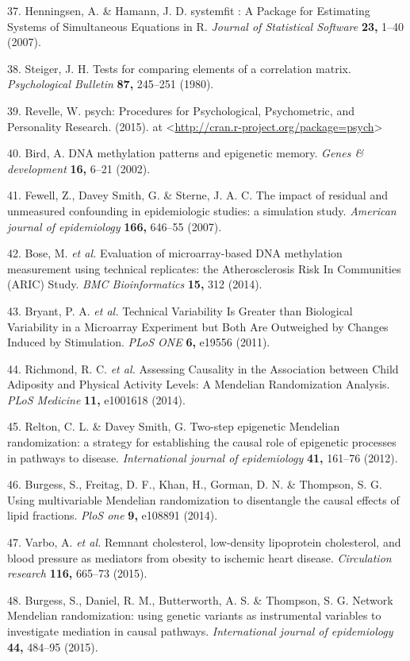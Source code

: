 \documentclass[]{article}
\begin{document}
\hypertarget{ref-Henningsen2007}{}
37. Henningsen, A. \& Hamann, J. D. systemfit : A Package for Estimating
Systems of Simultaneous Equations in R. \emph{Journal of Statistical
Software} \textbf{23,} 1--40 (2007).

\hypertarget{ref-Steiger1980}{}
38. Steiger, J. H. Tests for comparing elements of a correlation matrix.
\emph{Psychological Bulletin} \textbf{87,} 245--251 (1980).

\hypertarget{ref-Revelle2015}{}
39. Revelle, W. psych: Procedures for Psychological, Psychometric, and
Personality Research. (2015). at
\textless{}\url{http://cran.r-project.org/package=psych}\textgreater{}

\hypertarget{ref-Bird2002}{}
40. Bird, A. DNA methylation patterns and epigenetic memory. \emph{Genes
\& development} \textbf{16,} 6--21 (2002).

\hypertarget{ref-Fewell2007}{}
41. Fewell, Z., Davey Smith, G. \& Sterne, J. A. C. The impact of
residual and unmeasured confounding in epidemiologic studies: a
simulation study. \emph{American journal of epidemiology} \textbf{166,}
646--55 (2007).

\hypertarget{ref-Bose2014}{}
42. Bose, M. \emph{et al.} Evaluation of microarray-based DNA
methylation measurement using technical replicates: the Atherosclerosis
Risk In Communities (ARIC) Study. \emph{BMC Bioinformatics} \textbf{15,}
312 (2014).

\hypertarget{ref-Bryant2011}{}
43. Bryant, P. A. \emph{et al.} Technical Variability Is Greater than
Biological Variability in a Microarray Experiment but Both Are
Outweighed by Changes Induced by Stimulation. \emph{PLoS ONE}
\textbf{6,} e19556 (2011).

\hypertarget{ref-Richmond2014}{}
44. Richmond, R. C. \emph{et al.} Assessing Causality in the Association
between Child Adiposity and Physical Activity Levels: A Mendelian
Randomization Analysis. \emph{PLoS Medicine} \textbf{11,} e1001618
(2014).

\hypertarget{ref-Relton2012}{}
45. Relton, C. L. \& Davey Smith, G. Two-step epigenetic Mendelian
randomization: a strategy for establishing the causal role of epigenetic
processes in pathways to disease. \emph{International journal of
epidemiology} \textbf{41,} 161--76 (2012).

\hypertarget{ref-Burgess2014a}{}
46. Burgess, S., Freitag, D. F., Khan, H., Gorman, D. N. \& Thompson, S.
G. Using multivariable Mendelian randomization to disentangle the causal
effects of lipid fractions. \emph{PloS one} \textbf{9,} e108891 (2014).

\hypertarget{ref-Varbo2015}{}
47. Varbo, A. \emph{et al.} Remnant cholesterol, low-density lipoprotein
cholesterol, and blood pressure as mediators from obesity to ischemic
heart disease. \emph{Circulation research} \textbf{116,} 665--73 (2015).

\hypertarget{ref-Burgess2015}{}
48. Burgess, S., Daniel, R. M., Butterworth, A. S. \& Thompson, S. G.
Network Mendelian randomization: using genetic variants as instrumental
variables to investigate mediation in causal pathways.
\emph{International journal of epidemiology} \textbf{44,} 484--95
(2015).
\end{document}
